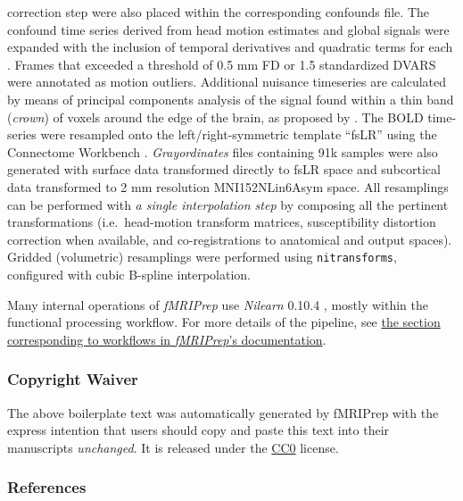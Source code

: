 \documentclass[
]{article}
\begin{document}
\begin{description}
correction step were also placed within the corresponding confounds
file. The confound time series derived from head motion estimates and
global signals were expanded with the inclusion of temporal derivatives
and quadratic terms for each \citep{confounds_satterthwaite_2013}.
Frames that exceeded a threshold of 0.5 mm FD or 1.5 standardized DVARS
were annotated as motion outliers. Additional nuisance timeseries are
calculated by means of principal components analysis of the signal found
within a thin band (\emph{crown}) of voxels around the edge of the
brain, as proposed by \citep{patriat_improved_2017}. The BOLD
time-series were resampled onto the left/right-symmetric template
``fsLR'' using the Connectome Workbench \citep{hcppipelines}.
\emph{Grayordinates} files \citep{hcppipelines} containing 91k samples
were also generated with surface data transformed directly to fsLR space
and subcortical data transformed to 2 mm resolution MNI152NLin6Asym
space. All resamplings can be performed with \emph{a single
interpolation step} by composing all the pertinent transformations
(i.e.~head-motion transform matrices, susceptibility distortion
correction when available, and co-registrations to anatomical and output
spaces). Gridded (volumetric) resamplings were performed using
\texttt{nitransforms}, configured with cubic B-spline interpolation.
\end{description}

Many internal operations of \emph{fMRIPrep} use \emph{Nilearn} 0.10.4
\citep[RRID:SCR\_001362]{nilearn}, mostly within the functional
processing workflow. For more details of the pipeline, see
\href{https://fmriprep.readthedocs.io/en/latest/workflows.html}{the
section corresponding to workflows in \emph{fMRIPrep}'s documentation}.

\subsubsection{Copyright Waiver}\label{copyright-waiver}

The above boilerplate text was automatically generated by fMRIPrep with
the express intention that users should copy and paste this text into
their manuscripts \emph{unchanged}. It is released under the
\href{https://creativecommons.org/publicdomain/zero/1.0/}{CC0} license.

\subsubsection{References}\label{references}

  
\end{document}

